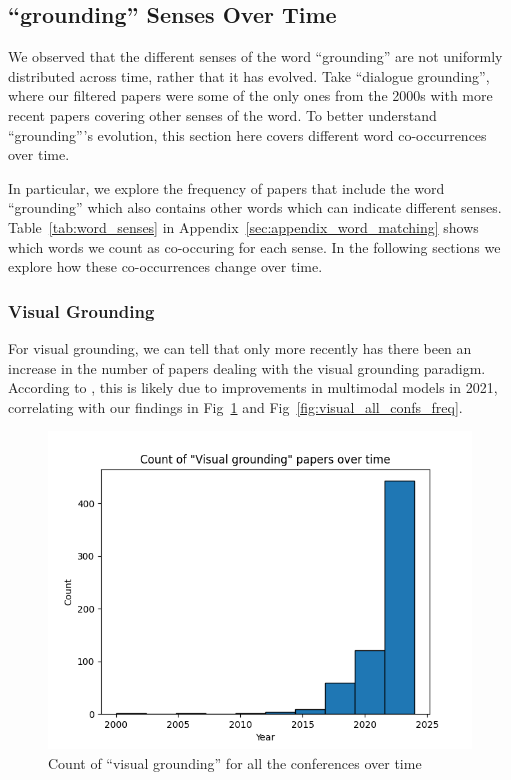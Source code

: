\documentclass[11pt]{article}
\begin{document}
\subsection{``grounding'' Senses Over Time}
\label{sec:coocurrence}
We observed that the different senses of the word ``grounding'' are not uniformly distributed across time, rather that it has evolved. Take ``dialogue grounding'', where our filtered papers were some of the only ones from the 2000s \cite{nakano-etal-2003-towards,Roque2007ReactingTA_dialogue} with more recent papers covering other senses of the word. To better understand ``grounding'''s evolution, this section here covers different word co-occurrences over time.

In particular, we explore the frequency of papers that include the word ``grounding'' which also contains other words which can indicate different senses. Table~\ref{tab:word_senses} in Appendix~\ref{sec:appendix_word_matching} shows which words we count as co-occuring for each sense. In the following sections we explore how these co-occurrences change over time.

\subsubsection{Visual Grounding}
For visual grounding, we can tell that only more recently has there been an increase in the number of papers dealing with the visual grounding paradigm. According to \citet{xiao2024visualgroundingsurvey}, this is likely due to improvements in multimodal models in 2021, correlating with our findings in Fig~\ref{fig:visual_all_confs_count} and Fig~\ref{fig:visual_all_confs_freq}.

\begin{figure}[h!]
  \includegraphics[width=\columnwidth]{figs/grounding_figs/Visual/all_confs_grounding_Visual.png}
  \caption{Count of ``visual grounding'' for all the conferences over time}
  \label{fig:visual_all_confs_count}
\end{figure}
\end{document}
